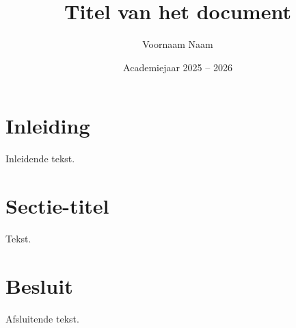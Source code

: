 \documentclass[kulak]{kulakarticle} %
\title{Titel van het document}
\author{Voornaam Naam}
\date{Academiejaar 2025 -- 2026}
\begin{document}
\maketitle

\section*{Inleiding}

Inleidende tekst.

\section{Sectie-titel}

Tekst.

\section*{Besluit}

Afsluitende tekst.
\end{document}
